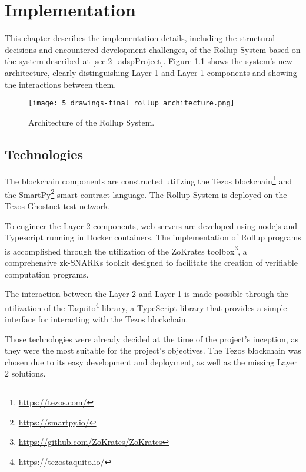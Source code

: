 \chapter{Implementation \label{cha:chapter5}}

This chapter describes the implementation details, including the structural decisions and  encountered development challenges, of the Rollup System based on the system described at \ref{sec:2_adspProject}. Figure \ref{fig:fig:5_drawings-final_rollup_archotecture.png} shows the system's new architecture, clearly distinguishing Layer 1 and Layer 1 components and showing the interactions between them.

\begin{figure}[ht]
	\centering
	\texttt{[image: 5\_drawings-final\_rollup\_architecture.png]}
	\caption[Scaling Solutions]{Architecture of the Rollup System.}  
	\label{fig:fig:5_drawings-final_rollup_archotecture.png}
  \end{figure} 

\section{Technologies\label{sec:technologies}}

The blockchain components are constructed utilizing the Tezos blockchain\footnote{\url{https://tezos.com/}} and the SmartPy\footnote{\url{https://smartpy.io/}} smart contract language. The Rollup System is deployed on the Tezos Ghostnet test network.

To engineer the Layer 2 components, web servers are developed using nodejs and Typescript running in Docker containers. The implementation of Rollup programs is accomplished through the utilization of the ZoKrates toolbox\footnote{\url{https://github.com/ZoKrates/ZoKrates}}, a comprehensive zk-SNARKs toolkit designed to facilitate the creation of verifiable computation programs.

The interaction between the Layer 2 and Layer 1 is made possible through the utilization of the Taquito\footnote{\url{https://tezostaquito.io/}} library, a TypeScript library that provides a simple interface for interacting with the Tezos blockchain.

Those technologies were already decided at the time of the project's inception, as they were the most suitable for the project's objectives. The Tezos blockchain was chosen due to its easy development and deployment, as well as the missing Layer 2 solutions.

